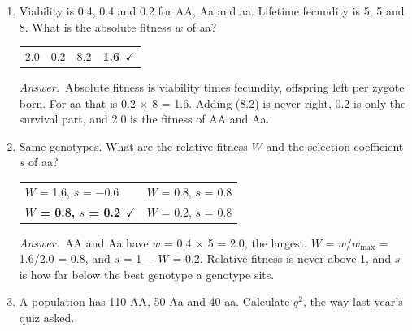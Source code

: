 \documentclass[11pt]{article}
\newcommand{\keyans}[1]{\par\medskip\noindent\textit{Answer.}\ #1\par\medskip}
\begin{document}
\vspace{0.6em}
\begin{enumerate}[label=\textbf{\arabic*.}, leftmargin=2em, itemsep=1.4em]
\item Viability is 0.4, 0.4 and 0.2 for AA, Aa and aa. Lifetime fecundity is 5, 5 and 8. What is the absolute fitness \(w\) of aa?
\nopagebreak\par{}
\par\smallskip\noindent\begin{tabularx}{\linewidth}{@{}YYYY@{}}
2.0 & 0.2 & 8.2 & \textbf{1.6}\ \(\checkmark\) \\
\end{tabularx}
\keyans{Absolute fitness is viability times fecundity, offspring left per zygote born. For aa that is 0.2 \(\times\) 8 = 1.6. Adding (8.2) is never right, 0.2 is only the survival part, and 2.0 is the fitness of AA and Aa.}
\item Same genotypes. What are the relative fitness \(W\) and the selection coefficient \(s\) of aa?
\nopagebreak\par{}
\par\smallskip\noindent\begin{tabularx}{\linewidth}{@{}YY@{}}
\(W\) = 1.6, \(s\) = \(-\)0.6 & \(W\) = 0.8, \(s\) = 0.8 \\[3pt]
\textbf{\(W\) = 0.8, \(s\) = 0.2}\ \(\checkmark\) & \(W\) = 0.2, \(s\) = 0.8 \\
\end{tabularx}
\keyans{AA and Aa have \(w\) = 0.4 \(\times\) 5 = 2.0, the largest. \(W\) = \(w\)/\(w_{\max}\) = 1.6/2.0 = 0.8, and \(s\) = 1 \(-\) \(W\) = 0.2. Relative fitness is never above 1, and \(s\) is how far below the best genotype a genotype sits.}
\item A population has 110 AA, 50 Aa and 40 aa. Calculate \(q^2\), the way last year's quiz asked.
\nopagebreak\par{}
\par\smallskip\noindent\begin{tabularx}{\linewidth}{@{}YYYY@{}}

\end{tabularx}
\end{enumerate}
\end{document}
